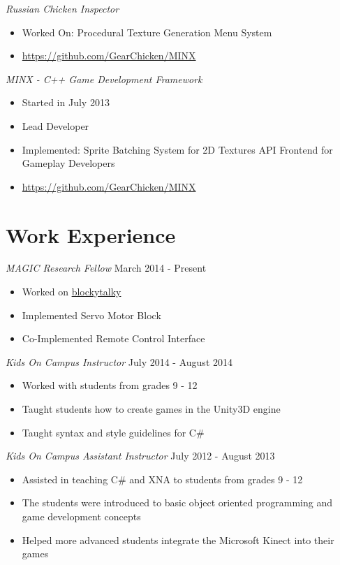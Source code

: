 \documentclass[line,margin]{res}
\begin{document}
\begin{resume}
{\sl Russian Chicken
Inspector}
\begin{itemize}
\itemsep1pt\parskip0pt
\item
Worked On:
\subitem
Procedural Texture Generation
\subitem
Menu System
\item
\url {https://github.com/GearChicken/MINX}
\end{itemize}

{\sl MINX - C++ Game Development
Framework}
\begin{itemize}
\itemsep1pt\parskip0pt
\item
Started in July 2013
\item Lead Developer
\item Implemented:
\subitem Sprite Batching System for 2D Textures
\subitem API Frontend for Gameplay Developers
\item
\url{https://github.com/GearChicken/MINX}
\end{itemize}


\section{Work Experience}

{\sl MAGIC Research Fellow} \hfill March 2014 - Present
\begin{itemize}
\itemsep1pt\parskip0pt
\item
  Worked on
  \href{https://github.com/liam-middlebrook/blockytalky.git}{blockytalky}
\item
  Implemented Servo Motor Block
\item
  Co-Implemented Remote Control Interface
\end{itemize}

{\sl Kids On Campus Instructor} \hfill July 2014 - August 2014
\begin{itemize}
\itemsep1pt\parskip0pt
\item
  Worked with students from grades 9 - 12
\item
  Taught students how to create games in the Unity3D engine
\item
  Taught syntax and style guidelines for C\#
\end{itemize}

{\sl Kids On Campus Assistant Instructor} \hfill July 2012 - August 2013
\begin{itemize}
\itemsep1pt\parskip0pt
\item
  Assisted in teaching C\# and XNA to students from grades 9 - 12
\item
  The students were introduced to basic object oriented programming and
  game development concepts
\item
  Helped more advanced students integrate the Microsoft Kinect into
  their games
\end{itemize}



\end{resume}
\end{document}
